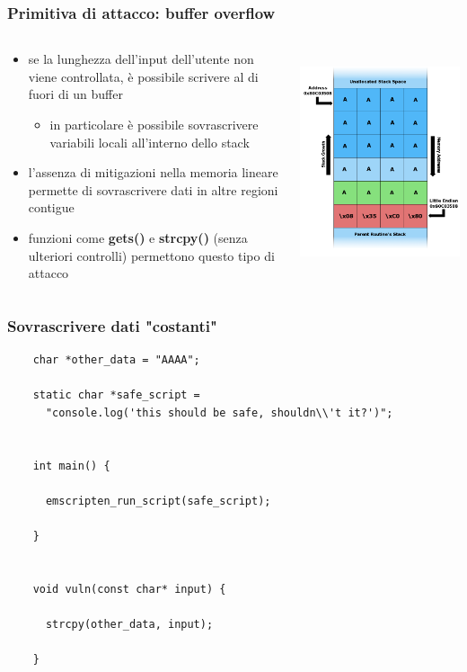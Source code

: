 \documentclass{beamer}
\newcommand\Fontvi{\fontsize{9.5}{7.2}\selectfont}
\begin{document}
\begin{frame}
  \frametitle{Primitiva di attacco: buffer overflow}
  \begin{columns}
    \begin{column}{0.6\textwidth}
      \begin{itemize}
        \item se la lunghezza dell'input dell'utente non viene controllata,
          è possibile scrivere al di fuori di un buffer
        \begin{itemize}
          \item in particolare è possibile sovrascrivere variabili locali
            all'interno dello stack
        \end{itemize}
        \item l'assenza di mitigazioni nella memoria lineare permette di sovrascrivere dati in altre regioni contigue
        \item funzioni come \textbf{gets()} e \textbf{strcpy()} (senza ulteriori controlli)
          permettono questo tipo di attacco  
      \end{itemize} 
    \end{column}
    \begin{column}{0.4\textwidth}
      \centerline{\includegraphics[width=10cm,height=6.5cm,keepaspectratio]{images/stack.png}}
    \end{column}
  \end{columns}
\end{frame}

\begin{frame}[fragile]
  \frametitle{Sovrascrivere dati "costanti"}
  \Fontvi
  \begin{verbatim}
    char *other_data = "AAAA";

    static char *safe_script = 
      "console.log('this should be safe, shouldn\\'t it?')";


    int main() {
       
      emscripten_run_script(safe_script);
    
    }


    void vuln(const char* input) {
    
      strcpy(other_data, input);

    }
  \end{verbatim}
\end{frame}
\end{document}
